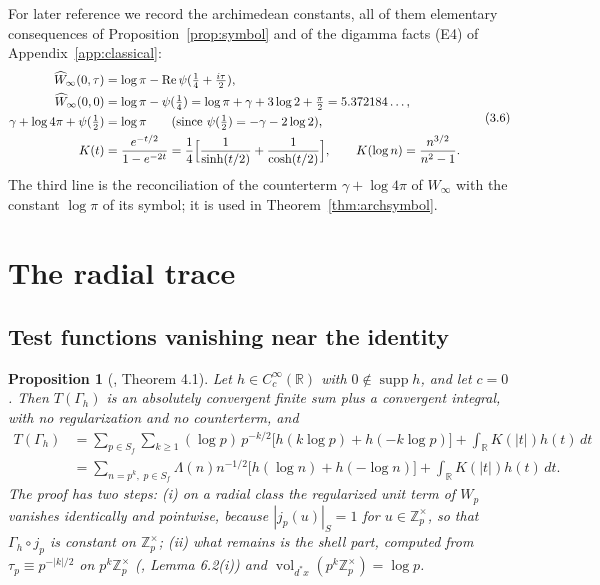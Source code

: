 \documentclass[11pt]{amsart}
\newtheorem{proposition}[theorem]{Proposition}
\theoremstyle{definition}
\theoremstyle{remark}
\newcommand{\R}{\mathbb R}
\newcommand{\Z}{\mathbb Z}
\newcommand{\Rel}{\operatorname{Re}}
\newcommand{\supp}{\operatorname{supp}}
\newcommand{\vol}{\operatorname{vol}}
\begin{document}
For later reference we record the archimedean constants, all of them
elementary consequences of Proposition~\ref{prop:symbol} and of the digamma facts (E4) of
Appendix~\ref{app:classical}:
\begin{equation}
\begin{aligned}
  \widehat W_\infty(0,\tau)&=\log\pi-\Rel\psi(\tfrac14+\tfrac{i\tau}2),\\
  \widehat W_\infty(0,0)&=\log\pi-\psi(\tfrac14)
    =\log\pi+\gamma+3\log2+\tfrac\pi2=5.372184\ldots,\\
  \gamma+\log4\pi+\psi(\tfrac12)&=\log\pi
   \qquad\text{(since }\psi(\tfrac12)=-\gamma-2\log2\text{)},\\
  K(t)&=\frac{e^{-t/2}}{1-e^{-2t}}
    =\frac14\Bigl[\frac1{\sinh(t/2)}+\frac1{\cosh(t/2)}\Bigr],
  \qquad K(\log n)=\frac{n^{3/2}}{n^2-1}.
\end{aligned}
\tag{3.6}
\end{equation}
The third line is the reconciliation of the counterterm $\gamma+\log4\pi$ of
$W_\infty$ with the constant $\log\pi$ of its symbol; it is used in
Theorem~\ref{thm:archsymbol}.

\section{The radial trace}
\label{sec:trace}

\subsection{Test functions vanishing near the identity}

\begin{proposition}[\cite{P44}, Theorem 4.1]
\label{prop:primepacket}
Let $h\in C_c^\infty(\R)$ with $0\notin\supp h$, and let $c=0$.  Then
$T(\Gamma_h)$ is an absolutely convergent finite sum plus a convergent
integral, with no regularization and no counterterm, and
\begin{align}
  T(\Gamma_h)
  &=\sum_{p\in S_f}\sum_{k\ge1}(\log p)\,p^{-k/2}
     \bigl[h(k\log p)+h(-k\log p)\bigr]+\int_\R K(|t|)h(t)\,dt
  \tag{4.1}\\
  &=\sum_{n=p^k,\;p\in S_f}\Lambda(n)n^{-1/2}
     \bigl[h(\log n)+h(-\log n)\bigr]+\int_\R K(|t|)h(t)\,dt .
  \tag{4.2}
\end{align}
The proof has two steps: \emph{(i)} on a radial class the regularized unit
term of $W_p$ vanishes identically and pointwise, because
$|j_p(u)|_S=1$ for $u\in\Z_p^\times$, so that $\Gamma_h\circ j_p$ is constant
on $\Z_p^\times$; \emph{(ii)} what remains is the shell part, computed from
$\tau_p\equiv p^{-|k|/2}$ on $p^k\Z_p^\times$ \emph{(\cite{P43}, Lemma 6.2(i))}
and $\vol_{d^*x}(p^k\Z_p^\times)=\log p$.
\end{proposition}
\end{document}
